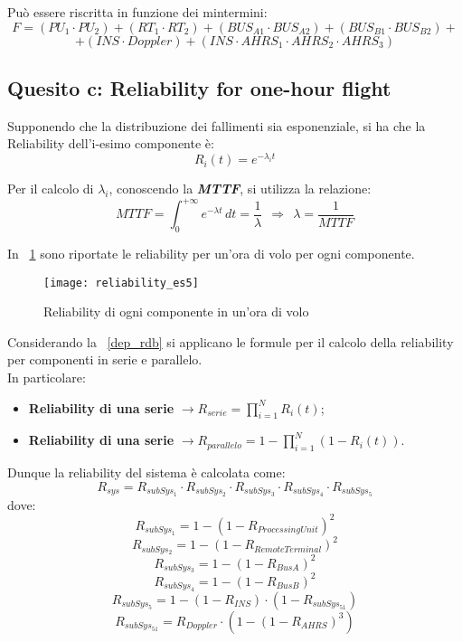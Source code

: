 Può essere riscritta in funzione dei mintermini:
$$ F = (PU_1 \cdot PU_2) + (RT_1 \cdot RT_2) + (BUS_{A1} \cdot BUS_{A2}) + (BUS_{B1} \cdot BUS_{B2})+$$
$$+ (INS \cdot Doppler) + (INS \cdot AHRS_1 \cdot AHRS_2 \cdot AHRS_3)$$

\clearpage

\subsection{Quesito c: Reliability for one-hour flight}

Supponendo che la distribuzione dei fallimenti sia esponenziale, si ha che la
Reliability dell'i-esimo componente è:
$$R_i(t) = e^{-\lambda_i t}$$

Per il calcolo di $\lambda_i$, conoscendo la \textbf{\textit{MTTF}}, si utilizza
la relazione:
$$ MTTF = \int_{0}^{+\infty} e^{-\lambda t}\, dt = \frac{1}{\lambda} \ \ \Longrightarrow \ \ \lambda = \frac{1}{MTTF} $$

In \figurename~\ref{dep_reliability_es5} sono riportate le reliability per un'ora di
volo per ogni componente.\\

\begin{figure}[!htbp]
  \centering
  \texttt{[image: reliability\_es5]}
  \caption{Reliability di ogni componente in un'ora di volo}
  \label{dep_reliability_es5}
\end{figure}

Considerando la \figurename~\ref{dep_rdb} si applicano le formule per il calcolo
della reliability per componenti in serie e parallelo.\\
In particolare:
\begin{itemize}
  \item \textbf{Reliability di una serie} $\rightarrow R_{serie} = \prod_{i=1}^{N}{R_i(t)}$;
  \item \textbf{Reliability di una serie} $\rightarrow R_{parallelo} = 1 - \prod_{i=1}^{N}{(1- R_i(t))}$.
\end{itemize}

Dunque la reliability del sistema è calcolata come:
$$ R_{sys} = R_{subSys_1} \cdot R_{subSys_2} \cdot R_{subSys_3} \cdot R_{subSys_4} \cdot R_{subSys_5}$$
dove:
$$R_{subSys_1} = 1 - (1 - R_{ProcessingUnit})^2$$
$$R_{subSys_2} = 1 - (1 - R_{RemoteTerminal})^2$$
$$R_{subSys_3} = 1 - (1 - R_{BusA})^2$$
$$R_{subSys_4} = 1 - (1 - R_{BusB})^2$$
$$R_{subSys_5} = 1 - (1 - R_{INS}) \cdot (1 - R_{subSys_{51}})$$
$$R_{subSys_{51}} = R_{Doppler} \cdot (1 - (1 - R_{AHRS})^3)$$

